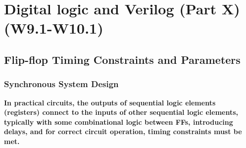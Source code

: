 \documentclass[12pt,openany]{book}
\begin{document}
\chapter{Digital logic and Verilog (Part X) (W9.1-W10.1)}
\section{Flip-flop Timing
Constraints and Parameters}
\subsection{Synchronous System Design}
\textbf{In practical circuits, the outputs of sequential logic elements (registers) connect to the inputs of other sequential logic elements, typically with some combinational logic between FFs, introducing delays, and for correct circuit operation, timing constraints must be met.}
\end{document}

